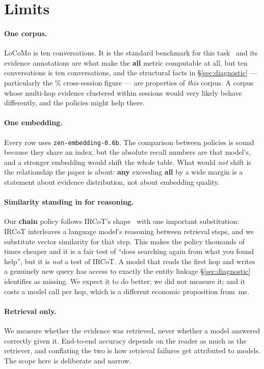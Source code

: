 \section{Limits}
\label{sec:limits}

\paragraph{One corpus.}
LoCoMo is ten conversations. It is the standard benchmark for this
task~\cite{locomo} and its evidence annotations are what make the \textbf{all}
metric computable at all, but ten conversations is ten conversations, and the
structural facts in \S\ref{sec:diagnostic} --- particularly the
\rSpanSessions{}\% cross-session figure --- are properties of \emph{this} corpus.
A corpus whose multi-hop evidence clustered within sessions would very likely
behave differently, and the policies might help there.

\paragraph{One embedding.}
Every row uses \texttt{zen-embedding-0.6b}. The comparison between policies is
sound because they share an index, but the absolute recall numbers are that
model's, and a stronger embedding would shift the whole table. What would
\emph{not} shift is the relationship the paper is about: \textbf{any} exceeding
\textbf{all} by a wide margin is a statement about evidence distribution, not
about embedding quality.

\paragraph{Similarity standing in for reasoning.}
Our \textbf{chain} policy follows IRCoT's shape~\cite{ircot} with one important
substitution: IRCoT interleaves a language model's reasoning between retrieval
steps, and we substitute vector similarity for that step. This makes the policy
thousands of times cheaper and it is a fair test of ``does searching again from
what you found help'', but it is \emph{not} a test of IRCoT. A model that reads
the first hop and writes a genuinely new query has access to exactly the entity
linkage \S\ref{sec:diagnostic} identifies as missing. We expect it to do better;
we did not measure it; and it costs a model call per hop, which is a different
economic proposition from \rPolChainMs{}\,ms.

\paragraph{Retrieval only.}
We measure whether the evidence was retrieved, never whether a model answered
correctly given it. End-to-end accuracy depends on the reader as much as the
retriever, and conflating the two is how retrieval failures get attributed to
models. The scope here is deliberate and narrow.
